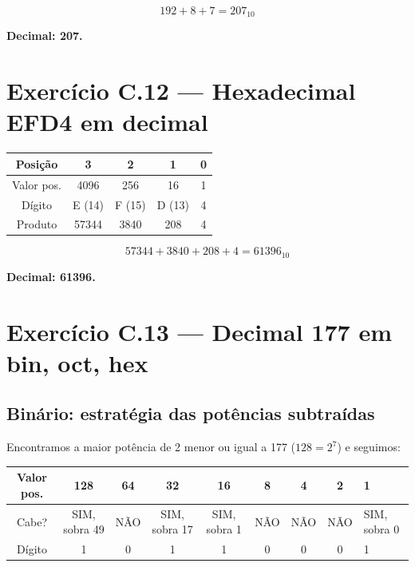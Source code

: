 \documentclass[11pt,a4paper]{article}
\begin{document}
\[
192 + 8 + 7 = \boxed{207_{10}}
\]

\begin{resposta}\textbf{Decimal: 207.}\end{resposta}

\newpage
\section{Exerc\'icio C.12 --- Hexadecimal EFD4 em decimal}

\begin{center}
\renewcommand{\arraystretch}{1.2}
\begin{tabular}{|c|c|c|c|c|}
\hline
Posi\c{c}\~ao        & 3      & 2     & 1   & 0 \\
\hline
Valor pos.     & 4096   & 256   & 16  & 1 \\
\hline
D\'igito        & E (14) & F (15)& D (13) & 4 \\
\hline
Produto       & 57344  & 3840  & 208 & 4 \\
\hline
\end{tabular}
\end{center}

\[
57344 + 3840 + 208 + 4 = \boxed{61396_{10}}
\]

\begin{resposta}\textbf{Decimal: 61396.}\end{resposta}

\section{Exerc\'icio C.13 --- Decimal 177 em bin, oct, hex}

\subsection*{Bin\'ario: estrat\'egia das pot\^encias subtra\'idas}

Encontramos a maior pot\^encia de 2 menor ou igual a 177 ($128 = 2^7$) e seguimos:

\begin{center}
\renewcommand{\arraystretch}{1.2}
\begin{tabular}{|c|c|c|c|c|c|c|c|}
\hline
Valor pos. & 128 & 64 & 32 & 16 & 8 & 4 & 2 & 1 \\
\hline
Cabe?      & SIM, sobra 49 & N\~AO & SIM, sobra 17 & SIM, sobra 1 & N\~AO & N\~AO & N\~AO & SIM, sobra 0 \\
\hline
D\'igito    & 1   & 0  & 1  & 1  & 0 & 0 & 0 & 1 \\
\hline
\end{tabular}
\end{center}
\end{document}
